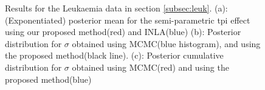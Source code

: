 \documentclass[ba]{imsart}
\begin{document}
\begin{figure}[ht]
\centering
{}
\caption{Results for the Leukaemia data in section \ref{subsec:leuk}. (a): (Exponentiated) posterior mean for the semi-parametric tpi effect using our proposed method(red) and INLA(blue) (b): Posterior distribution for $\sigma$ obtained using MCMC(blue histogram), and using the proposed method(black line). (c): Posterior cumulative distribution for $\sigma$ obtained using MCMC(red) and using the proposed method(blue)}
\label{fig:leuk}
\end{figure}
\end{document}
